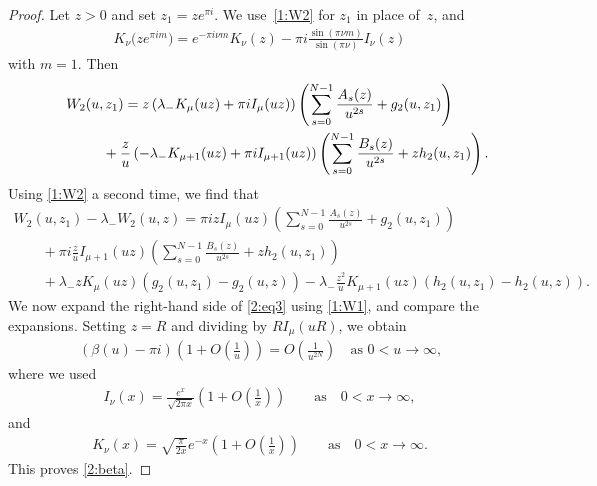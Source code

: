 \documentclass[pdftex]{sigma}
\numberwithin{equation}{section}
\begin{document}
\begin{proof}
Let $z>0$ and set $z_1=ze^{\pi i}$.
We use~\eqref{1:W2} for $z_1$ in place of~$z$, and \cite[(10.34.2)]{NIST}
\begin{gather}\label{3:ancontK}
K_\nu\big(ze^{\pi im}\big)= e^{-\pi i \nu m}K_\nu(z)-\pi i \frac{\sin(\pi \nu m)}{\sin(\pi \nu)} I_\nu(z)
\end{gather}
with $m=1$. Then
\begin{gather*}
 W_2(u,z_1) = z\left(\lambda_-K_\mu(uz)+\pi i I_\mu(uz)\right)\left(\sum_{s=0}^{N-1}\frac{A_s(z)}{u^{2s}}+g_2(u,z_1)\right)\\
\hphantom{W_2(u,z_1) =}{} +\frac{z}{u}\left(-\lambda_-K_{\mu+1}(uz)+\pi i I_{\mu+1}(uz)\right) \left(\sum_{s=0}^{N-1}\frac{B_s(z)}{u^{2s}}+zh_2(u,z_1)\right).
\end{gather*}
Using \eqref{1:W2} a second time, we f\/ind that
\begin{gather*}
 W_2(u,z_1)-\lambda_-W_2(u,z)=\pi i zI_\mu(uz)\left(\sum_{s=0}^{N-1}\frac{A_s(z)}{u^{2s}}+g_2(u,z_1)\right)\\
\qquad{}
+\pi i\frac{z}{u}I_{\mu+1}(uz) \left(\sum_{s=0}^{N-1}\frac{B_s(z)}{u^{2s}}+zh_2(u,z_1)\right)\\
\qquad{}
+\lambda_- zK_\mu(uz) (g_2(u,z_1)-g_2(u,z))-\lambda_-\frac{z^2}{u}K_{\mu+1}(uz)(h_2(u,z_1)-h_2(u,z)).
\end{gather*}
We now expand the right-hand side of \eqref{2:eq3} using \eqref{1:W1}, and compare the expansions.
Setting $z=R$ and dividing by $R I_\mu(uR)$, we obtain
\begin{gather*}
 (\beta(u)-\pi i) \left(1+O\left(\frac1u\right)\right)=O\left(\frac{1}{u^{2N}}\right) \quad \text{as $0<u\to\infty$,}
\end{gather*}
where we used \cite[(10.40.1)]{NIST}
\begin{gather}\label{2:asyI}
 I_\nu(x)=\frac{e^x}{\sqrt{2\pi x}}\left(1+O\left(\frac1x\right)\right)\qquad\text{as} \quad 0<x\to\infty,
\end{gather}
and \cite[(10.40.2)]{NIST}
\begin{gather}\label{2:asyK}
 K_\nu(x)=\sqrt{\frac\pi{2x}}e^{-x}\left(1+O\left(\frac1x\right)\right)\qquad\text{as} \quad 0<x\to\infty.
\end{gather}
This proves \eqref{2:beta}.
\end{proof}
\end{document}
